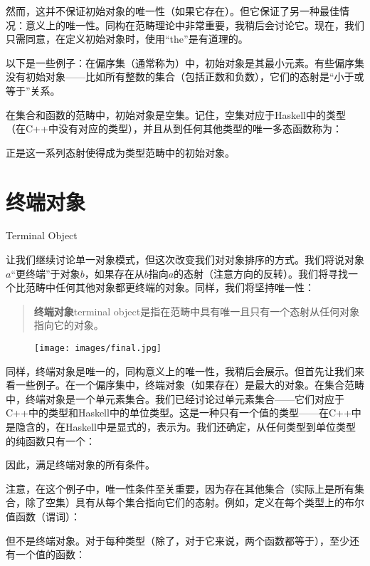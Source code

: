 \noindent
然而，这并不保证初始对象的唯一性（如果它存在）。但它保证了另一种最佳情况：意义上的唯一性。同构在范畴理论中非常重要，我稍后会讨论它。现在，我们只需同意，在定义初始对象时，使用“the”是有道理的。

以下是一些例子：在偏序集（通常称为）中，初始对象是其最小元素。有些偏序集没有初始对象——比如所有整数的集合（包括正数和负数），它们的态射是“小于或等于”关系。

在集合和函数的范畴中，初始对象是空集。记住，空集对应于Haskell中的类型（在C++中没有对应的类型），并且从到任何其他类型的唯一多态函数称为：

正是这一系列态射使得成为类型范畴中的初始对象。

\section{终端对象}{Terminal Object}

让我们继续讨论单一对象模式，但这次改变我们对对象排序的方式。我们将说对象$a$“更终端”于对象$b$，如果存在从$b$指向$a$的态射（注意方向的反转）。我们将寻找一个比范畴中任何其他对象都更终端的对象。同样，我们将坚持唯一性：

\begin{quote}
  \textbf{终端对象}{terminal object}是指在范畴中具有唯一且只有一个态射从任何对象指向它的对象。
\end{quote}

\begin{figure}[H]
  \centering
  \texttt{[image: images/final.jpg]}
\end{figure}

\noindent
同样，终端对象是唯一的，同构意义上的唯一性，我稍后会展示。但首先让我们来看一些例子。在一个偏序集中，终端对象（如果存在）是最大的对象。在集合范畴中，终端对象是一个单元素集合。我们已经讨论过单元素集合——它们对应于C++中的类型和Haskell中的单位类型\code{()}。这是一种只有一个值的类型——在C++中是隐含的，在Haskell中是显式的，表示为\code{()}。我们还确定，从任何类型到单位类型的纯函数只有一个：

因此，满足终端对象的所有条件。

注意，在这个例子中，唯一性条件至关重要，因为存在其他集合（实际上是所有集合，除了空集）具有从每个集合指向它们的态射。例如，定义在每个类型上的布尔值函数（谓词）：

但不是终端对象。对于每种类型（除了，对于它来说，两个函数都等于），至少还有一个值的函数：

